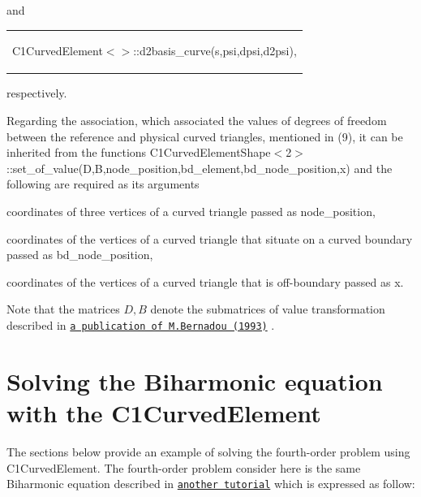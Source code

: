 and

\begin{center} \tabulinesep=1mm
\begin{longtabu} spread 0pt [c]{*{1}{|X[-1]}|}
\hline
\begin{center} {\ttfamily C1\+Curved\+Element$<$$>$\+::d2basis\+\_\+curve(s,psi,dpsi,d2psi)}, \end{center}    \\
\end{longtabu}
\end{center}  respectively.

Regarding the association, which associated the values of degrees of freedom between the reference and physical curved triangles, mentioned in (9), it can be inherited from the functions {\ttfamily C1\+Curved\+Element\+Shape$<$2$>$\+::set\+\_\+of\+\_\+value(\+D,\+B,node\+\_\+position,bd\+\_\+element,bd\+\_\+node\+\_\+position,x)} and the following are required as its arguments


\begin{DoxyItemize}
\item coordinates of three vertices of a curved triangle passed as {\ttfamily node\+\_\+position},
\item coordinates of the vertices of a curved triangle that situate on a curved boundary passed as {\ttfamily bd\+\_\+node\+\_\+position},
\item coordinates of the vertices of a curved triangle that is off-\/boundary passed as {\ttfamily x}.
\end{DoxyItemize}

Note that the matrices $ D, B $ denote the submatrices of value transformation described in \href{http://www.sciencedirect.com/science?_ob=MiamiImageURL&_cid=271868&_user=6991156&_pii=004578259390111A&_check=y&_origin=article&_zone=toolbar&_coverDate=31-Jan-1993&view=c&originContentFamily=serial&wchp=dGLzVlV-zSkzk&md5=d038a1aec18c25806e39c26187c2a200&pid=1-s2.0-004578259390111A-main.pdf}{\tt a publication of M.\+Bernadou (1993)} .



 

\hypertarget{index_reslt}{}\section{Solving the Biharmonic equation with the C1\+Curved\+Element}\label{index_reslt}
The sections below provide an example of solving the fourth-\/order problem using {\ttfamily C1\+Curved\+Element}. The fourth-\/order problem consider here is the same Biharmonic equation described in \href{../../../c1_element/bell_element/html/index.html}{\tt another tutorial} which is expressed as follow\+:

